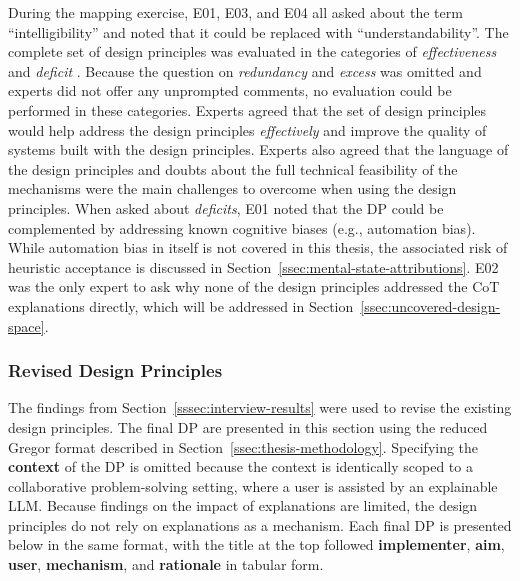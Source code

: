 During the mapping exercise, E01, E03, and E04 all asked about the term \enquote{intelligibility} and noted that it could be replaced with \enquote{understandability}. The complete set of design principles was evaluated in the categories of \textit{effectiveness} \parencite{Iivari2021} and \textit{deficit} \parencite{Janiesch2020}. Because the question on \textit{redundancy} and \textit{excess} was omitted and experts did not offer any unprompted comments, no evaluation could be performed in these categories. Experts agreed that the set of design principles would help address the design principles \textit{effectively} and improve the quality of systems built with the design principles. Experts also agreed that the language of the design principles and doubts about the full technical feasibility of the mechanisms were the main challenges to overcome when using the design principles. When asked about \textit{deficits}, E01 noted that the \ac{DP} could be complemented by addressing known cognitive biases (e.g., automation bias). While automation bias in itself is not covered in this thesis, the associated risk of heuristic acceptance \parencite{Jussupow2021} is discussed in Section~\ref{ssec:mental-state-attributions}. E02 was the only expert to ask why none of the design principles addressed the \ac{CoT} explanations directly, which will be addressed in Section~\ref{ssec:uncovered-design-space}.

\subsubsection{Revised Design Principles} \label{sssec:revised-dp}

The findings from Section~\ref{sssec:interview-results} were used to revise the existing design principles. The final DP are presented in this section using the reduced Gregor format described in Section~\ref{ssec:thesis-methodology}. Specifying the \textbf{context} of the DP is omitted because the context is identically scoped to a collaborative problem-solving setting, where a user is assisted by an explainable \ac{LLM}. Because findings on the impact of explanations are limited, the design principles do not rely on explanations as a mechanism. Each final \ac{DP} is presented below in the same format, with the title at the top followed \textbf{implementer}, \textbf{aim}, \textbf{user}, \textbf{mechanism}, and \textbf{rationale} in tabular form.


